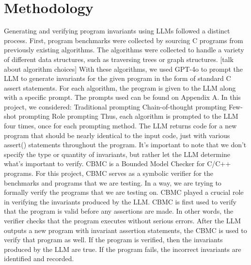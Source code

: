 \documentclass[conference]{IEEEtran}
\begin{document}
\section{Methodology}
Generating and verifying program invariants using LLMs followed a distinct process. First, program benchmarks were collected by sourcing C programs from previously existing algorithms. The algorithms were collected to handle a variety of different data structures, such as traversing trees or graph structures. [talk about algorithm choices]
	With these algorithms, we used GPT-4o to prompt the LLM to generate invariants for the given program in the form of standard C assert statements. For each algorithm, the program is given to the LLM along with a specific prompt. The prompts used can be found on Appendix A. In this project, we considered:
Traditional prompting
Chain-of-thought prompting
Few-shot prompting
Role prompting
Thus, each algorithm is prompted to the LLM four times, once for each prompting method. The LLM returns code for a new program that should be nearly identical to the input code, just with various assert() statements throughout the program. It’s important to note that we don’t specify the type or quantity of invariants, but rather let the LLM determine what’s important to verify.
CBMC is a Bounded Model Checker for C/C++ programs. For this project, CBMC serves as a symbolic verifier for the benchmarks and programs that we are testing. In a way, we are trying to formally verify the programs that we are testing on. 
CBMC played a crucial role in verifying the invariants produced by the LLM. CBMC is first used to verify that the program is valid before any assertions are made. In other words, the verifier checks that the program executes without serious errors. After the LLM outputs a new program with invariant assertion statements, the CBMC is used to verify that program as well. If the program is verified, then the invariants produced by the LLM are true. If the program fails, the incorrect invariants are identified and recorded.
\end{document}
